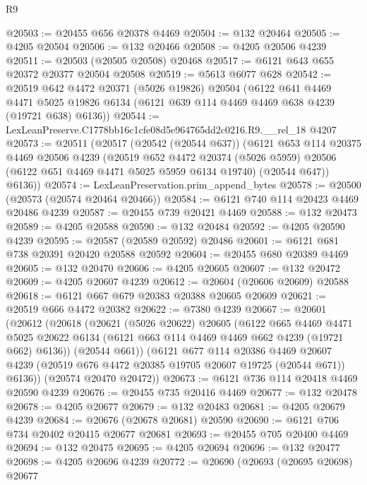 \begin{lexlean}{R9}
\begin{coremodule}
@20503 := @20455 @656 @20378 @4469
@20504 := @132 @20464
@20505 := @4205 @20504
@20506 := @132 @20466
@20508 := @4205 @20506 @4239
@20511 := @20503 (@20505 @20508) @20468
@20517 := @6121 @643 @655 @20372 @20377 @20504 @20508
@20519 := @5613 @6077 @628
@20542 := @20519
    @642
    @4472
    @20371
    (@5026 @19826)
    @20504
    (@6122
      @641
      @4469
      @4471
      @5025
      @19826
      @6134
      (@6121 @639 @114 @4469 @4469 @638 @4239 (@19721 @638) @6136))
@20544 := LexLeanPreserve.C1778bb16c1cfe08d5e964765dd2c0216.R9.__rel_18 @4207
@20573 := @20511
    (@20517
      (@20542 (@20544 @637))
      (@6121
        @653
        @114
        @20375
        @4469
        @20506
        @4239
        (@20519
          @652
          @4472
          @20374
          (@5026 @5959)
          @20506
          (@6122 @651 @4469 @4471 @5025 @5959 @6134 @19740)
          (@20544 @647))
        @6136))
@20574 := LexLeanPreservation.prim_append_bytes
@20578 := @20500 (@20573 (@20574 @20464 @20466))
@20584 := @6121 @740 @114 @20423 @4469 @20486 @4239
@20587 := @20455 @739 @20421 @4469
@20588 := @132 @20473
@20589 := @4205 @20588
@20590 := @132 @20484
@20592 := @4205 @20590 @4239
@20595 := @20587 (@20589 @20592) @20486
@20601 := @6121 @681 @738 @20391 @20420 @20588 @20592
@20604 := @20455 @680 @20389 @4469
@20605 := @132 @20470
@20606 := @4205 @20605
@20607 := @132 @20472
@20609 := @4205 @20607 @4239
@20612 := @20604 (@20606 @20609) @20588
@20618 := @6121 @667 @679 @20383 @20388 @20605 @20609
@20621 := @20519 @666 @4472 @20382
@20622 := @7380 @4239
@20667 := @20601
    (@20612
      (@20618
        (@20621
          (@5026 @20622)
          @20605
          (@6122
            @665
            @4469
            @4471
            @5025
            @20622
            @6134
            (@6121 @663 @114 @4469 @4469 @662 @4239 (@19721 @662) @6136))
          (@20544 @661))
        (@6121
          @677
          @114
          @20386
          @4469
          @20607
          @4239
          (@20519 @676 @4472 @20385 @19705 @20607 @19725 (@20544 @671))
          @6136))
      (@20574 @20470 @20472))
@20673 := @6121 @736 @114 @20418 @4469 @20590 @4239
@20676 := @20455 @735 @20416 @4469
@20677 := @132 @20478
@20678 := @4205 @20677
@20679 := @132 @20483
@20681 := @4205 @20679 @4239
@20684 := @20676 (@20678 @20681) @20590
@20690 := @6121 @706 @734 @20402 @20415 @20677 @20681
@20693 := @20455 @705 @20400 @4469
@20694 := @132 @20475
@20695 := @4205 @20694
@20696 := @132 @20477
@20698 := @4205 @20696 @4239
@20772 := @20690
    (@20693
      (@20695 @20698)
      @20677

\end{coremodule}
\end{lexlean}
